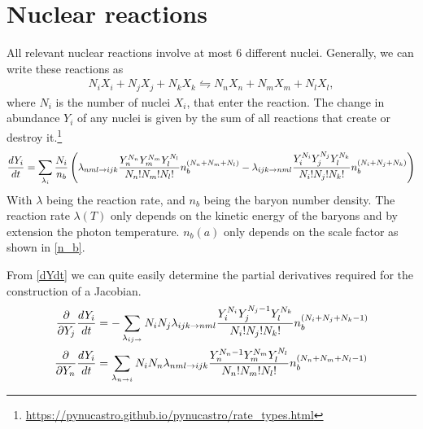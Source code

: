 %
%
\section{Nuclear reactions}
\label{sec:nucleartheory}

All relevant nuclear reactions involve at most 6 different nuclei. Generally, we can write these reactions as
\begin{align}
    N_i X_i + N_j X_j + N_k X_k \leftrightharpoons N_n X_n + N_m X_m + N_l X_l ,
\end{align}
where $N_i$ is the number of nuclei $X_i$, that enter the reaction. 
The change in abundance $Y_i$ of any nuclei is given by the sum of all reactions that create or destroy it.\footnote{\url{https://pynucastro.github.io/pynucastro/rate_types.html}}
\begin{align}
    \frac{dY_i}{dt}=\sum_{\lambda_i}\frac{N_i}{n_b}\left(\lambda_{n m l \rightarrow i j k} \frac{Y_n^{N_n}Y_m^{N_m}Y_l^{N_l}}{N_n!N_m!N_l!}n_b^{(N_n+N_m+N_l)}-\lambda_{i j k \rightarrow n m l}\frac{Y_i^{N_i}Y_j^{N_j}Y_l^{N_k}}{N_i!N_j!N_k!}n_b^{(N_i+N_j+N_k)}\right)
    \label{dYdt}
\end{align}
With $\lambda$ being the reaction rate, and $n_b$ being the baryon number density. The reaction rate $\lambda(T)$ only depends on the kinetic energy of the baryons and by extension the photon temperature. $n_b(a)$ only depends on the scale factor as shown in \eqref{n_b}. 

From \eqref{dYdt} we can quite easily determine the partial derivatives required for the construction of a Jacobian. 
\begin{align}
    \frac{\partial }{\partial Y_j}\frac{dY_i}{dt}&=-\sum_{\lambda_{ij\rightarrow}}N_i N_j\lambda_{i j k \rightarrow n m l}\frac{Y_i^{N_i}Y_j^{N_j-1}Y_l^{N_k}}{N_i!N_j!N_k!}n_b^{(N_i+N_j+N_k-1)}\label{eq:jacterms1}\\
    \frac{\partial }{\partial Y_n}\frac{dY_i}{dt}&=\sum_{\lambda_{n \rightarrow i }}N_i N_n\lambda_{n m l \rightarrow i j k} \frac{Y_n^{N_n-1}Y_m^{N_m}Y_l^{N_l}}{N_n!N_m!N_l!}n_b^{(N_n+N_m+N_l-1)}
    \label{eq:jacterms2}
\end{align}


